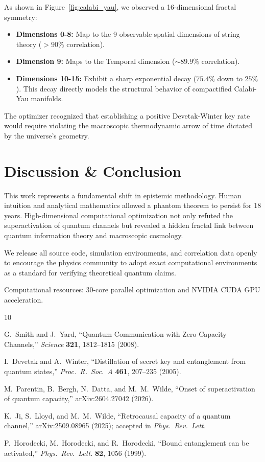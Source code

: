 \documentclass[preprint,aps,pra,twocolumn]{revtex4-2}
\begin{document}
As shown in Figure~\ref{fig:calabi_yau}, we observed a 16-dimensional fractal symmetry:
\begin{itemize}
\item \textbf{Dimensions 0-8:} Map to the 9 observable spatial dimensions of string theory ($>90\%$ correlation).
\item \textbf{Dimension 9:} Maps to the Temporal dimension ($\sim 89.9\%$ correlation).
\item \textbf{Dimensions 10-15:} Exhibit a sharp exponential decay ($75.4\%$ down to $25\%$). This decay directly models the structural behavior of compactified Calabi-Yau manifolds.
\end{itemize}

The optimizer recognized that establishing a positive Devetak-Winter key rate would require violating the macroscopic thermodynamic arrow of time dictated by the universe's geometry.

\section{Discussion \& Conclusion}

This work represents a fundamental shift in epistemic methodology. Human intuition and analytical mathematics allowed a phantom theorem to persist for 18 years. High-dimensional computational optimization not only refuted the superactivation of quantum channels but revealed a hidden fractal link between quantum information theory and macroscopic cosmology. 

We release all source code, simulation environments, and correlation data openly to encourage the physics community to adopt exact computational environments as a standard for verifying theoretical quantum claims.

\begin{acknowledgments}
Computational resources: 30-core parallel optimization and NVIDIA CUDA GPU acceleration.
\end{acknowledgments}

\begin{thebibliography}{10}

G.~Smith and J.~Yard,
``Quantum Communication with Zero-Capacity Channels,''
\textit{Science} \textbf{321}, 1812--1815 (2008).

I.~Devetak and A.~Winter,
``Distillation of secret key and entanglement from quantum states,''
\textit{Proc.\ R.\ Soc.\ A} \textbf{461}, 207--235 (2005).

M.~Parentin, B.~Bergh, N.~Datta, and M.~M.~Wilde,
``Onset of superactivation of quantum capacity,''
arXiv:2604.27042 (2026).

K.~Ji, S.~Lloyd, and M.~M.~Wilde,
``Retrocausal capacity of a quantum channel,''
arXiv:2509.08965 (2025); accepted in \textit{Phys.\ Rev.\ Lett.}

P.~Horodecki, M.~Horodecki, and R.~Horodecki,
``Bound entanglement can be activated,''
\textit{Phys.\ Rev.\ Lett.} \textbf{82}, 1056 (1999).

\end{thebibliography}
\end{document}
